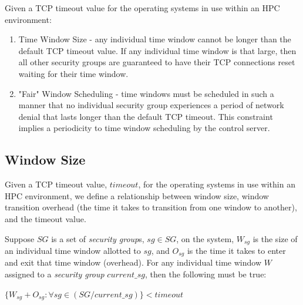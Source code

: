 \documentclass[oneside,12pt]{memoir}
\newcommand{\tab}{\hspace*{2em}}
\begin{document}
Given a TCP timeout value for the operating systems in use within an HPC environment:
\begin{enumerate} \itemsep1pt \parskip0pt 
\item Time Window Size - any individual time window cannot be longer than the default TCP timeout value. If any individual time window is that large, then all other security groups are guaranteed to have their TCP connections reset waiting for their time window.
\item "Fair" Window Scheduling - time windows must be scheduled in such a manner that no individual security group experiences a period of network denial that lasts longer than the default TCP timeout. This constraint implies a periodicity to time window scheduling by the control server.
\end{enumerate}

\subsection{Window Size}
Given a TCP timeout value, $timeout$, for the operating systems in use within an HPC environment, we define a relationship between window size, window transition overhead (the time it takes to transition from one window to another), and the timeout value.

Suppose $SG$ is a set of \textit{security group}s, $sg\in SG$, on the system, $W_{sg}$ is the size of an individual time window allotted to $sg$, and $O_{sg}$ is the time it takes to enter and exit that time window (overhead). For any individual time window $W$ assigned to a \textit{security group} $current\_sg$, then the following must be true:

\tab $\{W_{sg} + O_{sg}: \forall sg\in (SG / current\_sg)\} < timeout$
\end{document}
